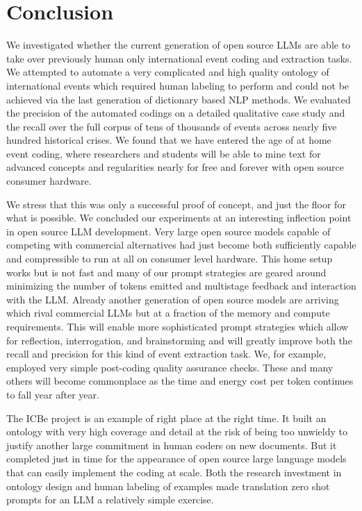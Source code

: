 \documentclass[
]{article}
\begin{document}
\section{Conclusion}\label{conclusion}

We investigated whether the current generation of open source LLMs are
able to take over previously human only international event coding and
extraction tasks. We attempted to automate a very complicated and high
quality ontology of international events which required human labeling
to perform and could not be achieved via the last generation of
dictionary based NLP methods. We evaluated the precision of the
automated codings on a detailed qualitative case study and the recall
over the full corpus of tens of thousands of events across nearly five
hundred historical crises. We found that we have entered the age of at
home event coding, where researchers and students will be able to mine
text for advanced concepts and regularities nearly for free and forever
with open source consumer hardware.

We stress that this was only a successful proof of concept, and just the
floor for what is possible. We concluded our experiments at an
interesting inflection point in open source LLM development. Very large
open source models capable of competing with commercial alternatives had
just become both sufficiently capable and compressible to run at all on
consumer level hardware. This home setup works but is not fast and many
of our prompt strategies are geared around minimizing the number of
tokens emitted and multistage feedback and interaction with the LLM.
Already another generation of open source models are arriving which
rival commercial LLMs but at a fraction of the memory and compute
requirements. This will enable more sophisticated prompt strategies
which allow for reflection, interrogation, and brainstorming and will
greatly improve both the recall and precision for this kind of event
extraction task. We, for example, employed very simple post-coding
quality assurance checks. These and many others will become commonplace
as the time and energy cost per token continues to fall year after year.

The ICBe project is an example of right place at the right time. It
built an ontology with very high coverage and detail at the risk of
being too unwieldy to justify another large commitment in human coders
on new documents. But it completed just in time for the appearance of
open source large language models that can easily implement the coding
at scale. Both the research investment in ontology design and human
labeling of examples made translation zero shot prompts for an LLM a
relatively simple exercise.
\end{document}
